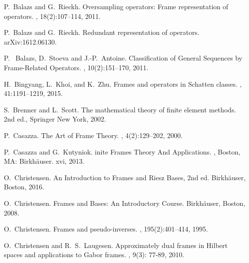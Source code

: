 \documentclass{birkjour}
\theoremstyle{definition}
\theoremstyle{remark}
\numberwithin{equation}{section}
\begin{document}
\begin{thebibliography}{10}
P.~Balazs and G.~Rieckh.
\newblock  Oversampling operators: Frame representation of operators.
, 
18(2):107--114, 2011.



P.~Balazs and G.~Rieckh.
\newblock  Redundant representation of operators.
\newblock arXiv:1612.06130.



P.~ Balazs, D.~Stoeva and J.-P.~Antoine.
\newblock  Classification of General Sequences by Frame-Related Operators.
, 
10(2):151--170, 2011.


  
H.~Bingyang, L.~Khoi, and K.~Zhu.
\newblock  Frames and operators in Schatten
  classes.
, 
41:1191--1219, 2015.

  
S.~Brenner and L.~Scott.
\newblock  The mathematical theory of finite element
  methods.
\newblock 2nd ed., Springer New York, 2002.


P.~Casazza.
\newblock  The Art of Frame Theory.
, 
4(2):129--202, 2000. 


 
P.~{C}asazza and G.~{K}utyniok.
inite {F}rames {T}heory
  {A}nd {A}pplications.
, 
{B}oston, {M}{A}: {B}irkh{\"a}user. xvi, 2013.
  

  


O.~Christensen.
\newblock  An Introduction to Frames and {R}iesz Bases, 2nd ed.
\newblock Birkh\"{a}user, Boston, 2016.


O.~Christensen.
\newblock  Frames and Bases: An Introductory Course.
\newblock Birkh\"{a}user, Boston, 2008.




O.~Christensen.
\newblock  Frames and pseudo-inverses.
, 
195(2):401--414, 1995.



O.~Christensen and R.~S.~Laugesen.
\newblock Approximately dual frames in Hilbert spaces and applications to Gabor frames.
, 9(3): 77-89, 2010.




\end{thebibliography}
\end{document}
